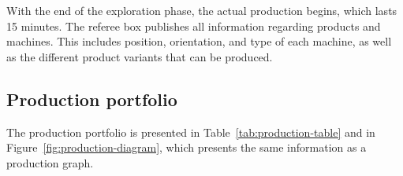 \documentclass[12pt,twoside]{article}
\newcommand{\mytable}[1]{\savebox{\myt}{#1}\tikz\node[fill=gray!25!white]{\usebox{\myt}};}
\begin{document}
With the end of the exploration phase, the actual production begins,
which lasts \num{15} minutes. The referee box publishes all information
regarding products and machines. This includes position, orientation,
and type of each machine, as well as the different product variants
that can be produced.


\subsection{Production portfolio}
\label{sec:prodportfolio}

The production portfolio is presented in
Table~\ref{tab:production-table} and in
Figure~\ref{fig:production-diagram}, which presents the same information
as a production graph.







\end{document}
